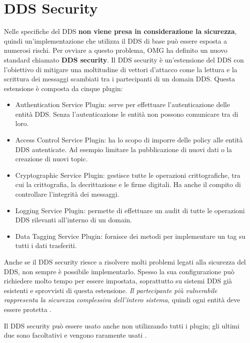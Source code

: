 \section{DDS Security}
Nelle specifiche del DDS 
\textbf{non viene presa in considerazione la sicurezza}, quindi
un'implementazione che utilizza il DDS di base può essere esposta a numerosi 
rischi. Per ovviare a questo problema, OMG ha definito un nuovo standard 
chiamato \textbf{DDS security}. Il DDS security è un'estensione del DDS con 
l'obiettivo di mitigare una moltitudine di vettori d'attacco come 
la lettura e la scrittura dei messaggi scambiati tra i partecipanti di un 
domain DDS. Questa estensione è composta da cinque plugin:
\begin{itemize}
    \item Authentication Service Plugin: serve per effettuare l'autenticazione 
    delle entità DDS. Senza l'autenticazione le entità non possono
    comunicare tra di loro.
    \item Access Control Service Plugin: ha lo scopo di imporre 
    delle policy alle entità DDS autenticate. Ad esempio limitare
    la pubblicazione di nuovi dati o la creazione di nuovi topic.
    \item Cryptographic Service Plugin: gestisce tutte le operazioni 
    crittografiche, tra cui la crittografia, la decrittazione e
    le firme digitali. Ha anche il compito di controllare l'integrità
    dei messaggi.
    \item Logging Service Plugin: permette di effettuare un audit di 
    tutte le operazioni DDS rilevanti all'interno di un domain.
    \item Data Tagging Service Plugin: fornisce dei metodi per implementare
    un tag su tutti i dati trasferiti. 
\end{itemize}
Anche se il DDS security riesce a risolvere molti problemi legati alla
sicurezza del DDS, non sempre è possibile implementarlo. Spesso 
la sua configurazione può richiedere molto tempo per essere 
impostata, soprattutto su sistemi DDS già esistenti e sprovvisti di 
questa estensione.
\textit{Il partecipante più vulnerabile rappresenta la sicurezza
complessiva dell'intero sistema}, quindi ogni entità deve essere
protetta \cite{Michaud2017Apr}. 

Il DDS security può essere usato anche non utilizzando tutti i plugin;
gli ultimi due sono facoltativi e vengono 
raramente usati \cite{essay93639}. 
\label{DDS Security}


